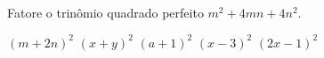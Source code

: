Fatore o trinômio quadrado perfeito $m^2+4mn+4n^2$.

$(m+2n)^2$
$(x+y)^2$
$(a+1)^2$
$(x-3)^2$
$(2x-1)^2$



